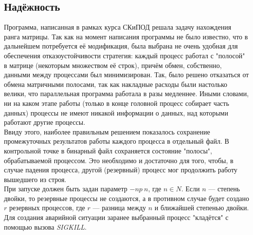 \documentclass[a4paper]{article}
\begin{document}
\subsection{Надёжность}
Программа, написанная в рамках курса СКиПОД решала задачу нахождения ранга матрицы. Так как на момент написания программы не было известно, что в дальнейшем потребуется её модификация, была выбрана не очень удобная для обеспечения отказоустойчивости стратегия: каждый процесс работал с "полосой" в матрице (некоторым множеством её строк), причём обмен, собственно, данными между процессами был минимизирован. Так, было решено отказаться от обмена матричными полосами, так как накладные расходы были настолько велики, что параллельная программа работала в разы медленнее. Иными словами, ни на каком этапе работы (только в конце головной процесс собирает часть данных) процессы не имеют никакой информации о данных, над которыми работают другие процессы.\\
Ввиду этого, наиболее правильным решением показалось сохранение промежуточных результатов работы каждого процесса в отдельный файл. В контрольной точке в бинарный файл сохраняется состояние "полосы", обрабатываемой процессом. Это необходимо и достаточно для того, чтобы, в случае падения процесса, другой (резервный) процесс мог продолжить работу вышедшего из строя.\\
При запуске должен быть задан параметр $-np\ n$, где $n \in N$. Если $n$ --- степень двойки, то резервные процессы не создаются, а в противном случае будет создано $r$ резервных процессов, где $r$ --- разница между $n$ и ближайшей степенью двойки. Для создания аварийной ситуации заранее выбранный процесс "кладётся" с помощью вызова \textit{SIGKILL}.
\end{document}
